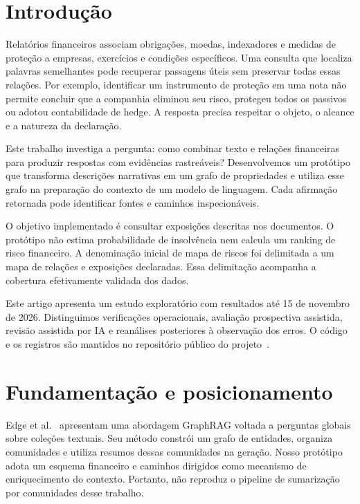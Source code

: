 \documentclass[conference]{IEEEtran}
\begin{document}
\section{Introdução}

Relatórios financeiros associam obrigações, moedas, indexadores e medidas de proteção a empresas, exercícios e condições específicos. Uma consulta que localiza palavras semelhantes pode recuperar passagens úteis sem preservar todas essas relações. Por exemplo, identificar um instrumento de proteção em uma nota não permite concluir que a companhia eliminou seu risco, protegeu todos os passivos ou adotou contabilidade de hedge. A resposta precisa respeitar o objeto, o alcance e a natureza da declaração.

Este trabalho investiga a pergunta: como combinar texto e relações financeiras para produzir respostas com evidências rastreáveis? Desenvolvemos um protótipo que transforma descrições narrativas em um grafo de propriedades e utiliza esse grafo na preparação do contexto de um modelo de linguagem. Cada afirmação retornada pode identificar fontes e caminhos inspecionáveis.

O objetivo implementado é consultar exposições descritas nos documentos. O protótipo não estima probabilidade de insolvência nem calcula um ranking de risco financeiro. A denominação inicial de mapa de riscos foi delimitada a um mapa de relações e exposições declaradas. Essa delimitação acompanha a cobertura efetivamente validada dos dados.

Este artigo apresenta um estudo exploratório com resultados até 15 de novembro de 2026. Distinguimos verificações operacionais, avaliação prospectiva assistida, revisão assistida por IA e reanálises posteriores à observação dos erros. O código e os registros são mantidos no repositório público do projeto~\cite{repo}.

\section{Fundamentação e posicionamento}

Edge et al.~\cite{edge} apresentam uma abordagem GraphRAG voltada a perguntas globais sobre coleções textuais. Seu método constrói um grafo de entidades, organiza comunidades e utiliza resumos dessas comunidades na geração. Nosso protótipo adota um esquema financeiro e caminhos dirigidos como mecanismo de enriquecimento do contexto. Portanto, não reproduz o pipeline de sumarização por comunidades desse trabalho.
\end{document}
